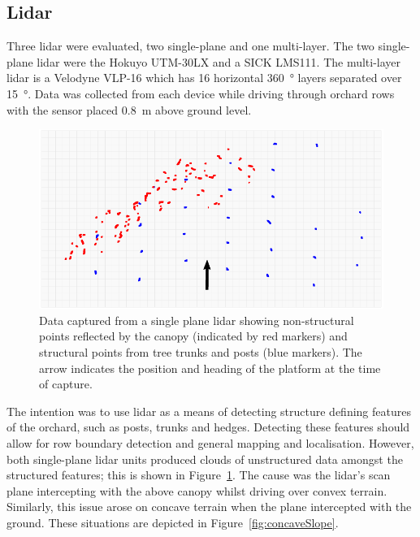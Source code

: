 \documentclass[preprint,authoryear,12pt]{elsarticle}
\begin{document}
    \subsection{Lidar}
        Three lidar were evaluated, two single-plane and one multi-layer.
        The two single-plane lidar were the Hokuyo UTM-30LX and a SICK LMS111.
        The multi-layer lidar is a Velodyne VLP-16 which has 16 horizontal \SI{360}{\degree} layers separated over \SI{15}{\degree}.
        Data was collected from each device while driving through orchard rows with the sensor placed \SI{0.8}{\meter} above ground level.

        \begin{figure}[htb]
            \centering
            \includegraphics[width=\linewidth]{imgs/canopy_data/canopy_data.pdf}
            \caption{
                Data captured from a single plane lidar showing non-structural points reflected by the canopy (indicated by red markers) and structural points from tree trunks and posts (blue markers).
                The arrow indicates the position and heading of the platform at the time of capture.
            }
            \label{fig:canopyDataCloud}
        \end{figure}

        The intention was to use lidar as a means of detecting structure defining features of the orchard, such as posts, trunks and hedges.
        Detecting these features should allow for row boundary detection and general mapping and localisation.
        However, both single-plane lidar units produced clouds of unstructured data amongst the structured features; this is shown in Figure~\ref{fig:canopyDataCloud}.
        The cause was the lidar's scan plane intercepting with the above canopy whilst driving over convex terrain.
        Similarly, this issue arose on concave terrain when the plane intercepted with the ground.
        These situations are depicted in Figure~\ref{fig:concaveSlope}.
\end{document}
